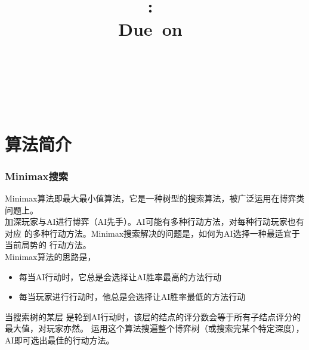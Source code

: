 \documentclass[a4paper]{article}
\title{
\vspace{2in}
\textmd{\textbf{\hmwkClass:\ \hmwkTitle}}\\
\normalsize\vspace{0.1in}\small{Due\ on\ \hmwkDueDate}\\
\vspace{0.1in}\large{\textit{\hmwkClassInstructor\ \hmwkClassTime}}
\vspace{3in}
}
\author{\textbf{\LARGE{\hmwkAuthorName}} \\ \\ \textbf{\LARGE{\hmwkAuthorId}}}
\date{} %
\begin{document}

\maketitle




\renewcommand{\contentsname}{Content} %
\newpage
\tableofcontents
{}
\newpage



\section{算法简介}
\subsubsection{Minimax搜索}
Minimax算法即最大最小值算法，它是一种树型的搜索算法，被广泛运用在博弈类
问题上。\\

加深玩家与AI进行博弈（AI先手）。AI可能有多种行动方法，对每种行动玩家也有对应
的多种行动方法。Minimax搜索解决的问题是，如何为AI选择一种最适宜于当前局势的
行动方法。\\

Minimax算法的思路是，
\begin{itemize}
    \item 每当AI行动时，它总是会选择让AI胜率最高的方法行动
    \item 每当玩家进行行动时，他总是会选择让AI胜率最低的方法行动
\end{itemize}
当搜索树的某层
是轮到AI行动时，该层的结点的评分数会等于所有子结点评分的最大值，对玩家亦然。
运用这个算法搜遍整个博弈树（或搜索完某个特定深度），AI即可选出最佳的行动方法。\\
\end{document}
